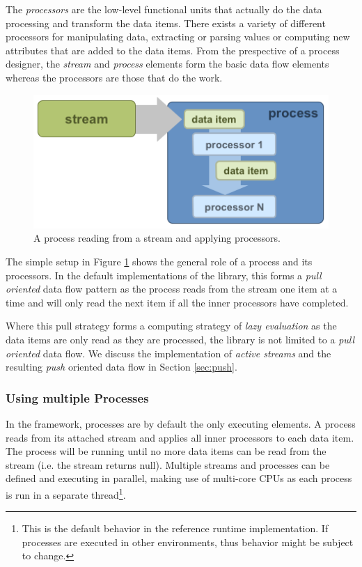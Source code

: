The {\em processors} are the low-level functional units that actually
do the data processing and transform the data items. There exists a
variety of different processors for manipulating data, extracting or
parsing values or computing new attributes that are added to the data
items.  From the prespective of a process designer, the {\em stream}
and {\em process} elements form the basic data flow elements whereas
the processors are those that do the work.

\begin{figure}[h!]
\centering
\includegraphics[scale=0.5]{graphics/inside-process.png}
\caption{\label{fig:process}A process reading from a stream and applying processors.}
\end{figure}

The simple setup in Figure \ref{fig:process} shows the general role of
a process and its processors. In the default implementations of the
\streams library, this forms a {\em pull oriented} data flow pattern
as the process reads from the stream one item at a time and will only
read the next item if all the inner processors have completed. 

Where this pull strategy forms a computing strategy of {\em lazy
  evaluation} as the data items are only read as they are processed,
the \streams library is not limited to a {\em pull oriented} data
flow. We discuss the implementation of {\em active streams} and the
resulting {\em push} oriented data flow in Section \ref{sec:push}.


\subsubsection*{Using multiple Processes}
In the \streams framework, processes are by default the only executing
elements. A process reads from its attached stream and applies all
inner processors to each data item. The process will be running until
no more data items can be read from the stream (i.e. the stream
returns {\ttfamily null}). Multiple streams and processes can be
defined and executing in parallel, making use of multi-core CPUs as
each process is run in a separate thread\footnote{This is the default
  behavior in the reference \streams runtime implementation. If
  \streams processes are executed in other environments, thus behavior
  might be subject to change.}.

